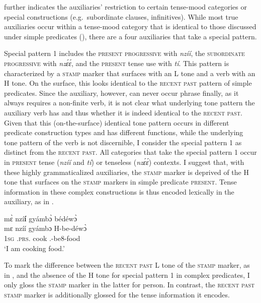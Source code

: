  further indicates the auxiliaries' restriction to certain tense-mood categories or special constructions (e.g.\ subordinate clauses, infinitives). While most true auxiliaries occur within a tense-mood category that is identical to those discussed under simple predicates (), there are a four auxiliaries that take a special pattern.

Special pattern 1 includes the \textsc{present progressive} with {\itshape nzíí}, the \textsc{subordinate progressive} with {\itshape nzɛ́ɛ́}, and the \textsc{present} tense use with {\itshape tí}. This pattern is characterized by a \textsc{stamp} marker that surfaces with an L tone and a verb with an H tone. On the surface, this looks identical to the \textsc{recent past} pattern of simple predicates. Since the auxiliary, however, can never occur phrase finally, as it always requires a non-finite verb, it is not clear what underlying tone pattern the auxiliary verb has and thus whether it is indeed identical to the \textsc{recent past}. Given that this (on-the-surface) identical tone pattern occurs in different predicate construction types and has different functions, while the underlying tone pattern of the verb is not discernible, I consider the special pattern 1 as distinct from the \textsc{recent past}.  All categories that take the special pattern 1 occur in \textsc{present} tense ({\itshape nzíí} and {\itshape tí}) or tenseless ({\itshape nzɛ́ɛ́}) contexts. I suggest that, with these highly grammaticalized auxiliaries, the \textsc{stamp} marker is deprived of the H tone that surfaces on the \textsc{stamp} markers in simple predicate \textsc{present}. Tense information in these complex constructions is thus encoded lexically in the auxiliary, as in .

\ea\label{nzii1}
  \glll  mɛ̀ nzí{\bfseries í} gyámbɔ̀ bédéwɔ̀ \\
         mɛ nzíí gyámbɔ H-be-déwɔ̀ \\
            1\textsc{sg} {\PROG}.\textsc{prs}.{\R} cook {\OBJ}.{\LINK}-be8-food\\
    \trans `I am cooking food.'
\z

To mark the difference between the \textsc{recent past} L tone of the \textsc{stamp} marker, as in , and the absence of the H tone for special pattern 1 in complex predicates, I only gloss the \textsc{stamp} marker in the latter for person. In contrast, the \textsc{recent past} \textsc{stamp} marker is additionally glossed for the tense information it encodes.

